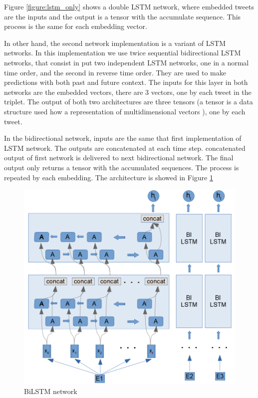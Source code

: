 \documentclass[12pt]{report}
\begin{document}
Figure \ref{figure:lstm_only} shows a double \ac{LSTM} network, where embedded tweets are the inputs and the output is a tensor with the accumulate sequence. This process is the same for each embedding vector.

In other hand, the second network implementation is a variant of \ac{LSTM} networks. In this implementation we use twice sequential bidirectional LSTM networks, that consist in put two independent \ac{LSTM} networks, one in a normal time order, and the second in reverse time order. They are used to make predictions with both past and future context. The inputs for this layer in both networks are the embedded vectors, there are 3 vectors, one by each tweet in the triplet. The output of both two architectures are three tensors (a tensor is a data structure used how a representation of multidimensional vectors \cite{Tensor2019}), one by each tweet.

In the bidirectional network, inputs are the same that first implementation of \ac{LSTM} network. The outputs are concatenated at each time step. concatenated output of first network is delivered to next bidirectional network. The final output only returns a tensor with the accumulated sequences. The process is repeated by each embedding. The architecture is showed in Figure \ref{figure:bilstm}


\begin{figure}[H]	
	\centering
	\includegraphics[width=150mm, scale = 1]{images/13_bilstm.png}	
	\caption{BiLSTM network}	
	\label{figure:bilstm}
\end{figure}
\end{document}
